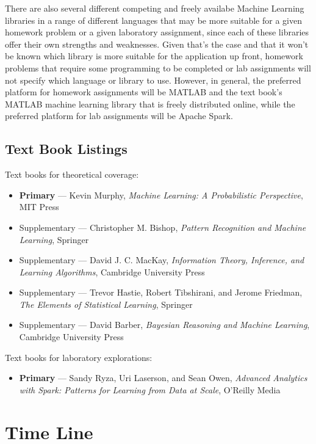 \documentclass[12pt]{article}
\begin{document}
There are also several different competing and freely availabe Machine Learning libraries in a range of different languages that
may be more suitable for a given homework problem or a given laboratory assignment, since each of these libraries offer their
own strengths and weaknesses. Given that's the case and that it won't be known which library is more suitable for the application
up front, homework problems that require some programming to be completed or lab assignments will not specify which language or
library to use. However, in general, the preferred platform for homework assignments will be MATLAB and the text book's MATLAB
machine learning library that is freely distributed online, while the preferred platform for lab assignments will be Apache
Spark.

\subsection{Text Book Listings}

Text books for theoretical coverage:
\begin{itemize}
\item \textbf{Primary} --- Kevin Murphy, \textit{Machine Learning: A Probabilistic Perspective}, MIT Press
\item Supplementary --- Christopher M. Bishop, \textit{Pattern Recognition and Machine Learning}, Springer
\item Supplementary --- David J. C. MacKay, \textit{Information Theory, Inference, and Learning Algorithms}, Cambridge University Press
\item Supplementary --- Trevor Hastie, Robert Tibshirani, and Jerome Friedman, \textit{The Elements of Statistical Learning}, Springer
\item Supplementary --- David Barber, \textit{Bayesian Reasoning and Machine Learning}, Cambridge University Press
\end{itemize}

Text books for laboratory explorations:
\begin{itemize}
\item \textbf{Primary} --- Sandy Ryza, Uri Laserson, and Sean Owen, \textit{Advanced Analytics with Spark: Patterns for Learning from Data at Scale}, O'Reilly Media 
\end{itemize}

\section{Time Line}
\end{document}

